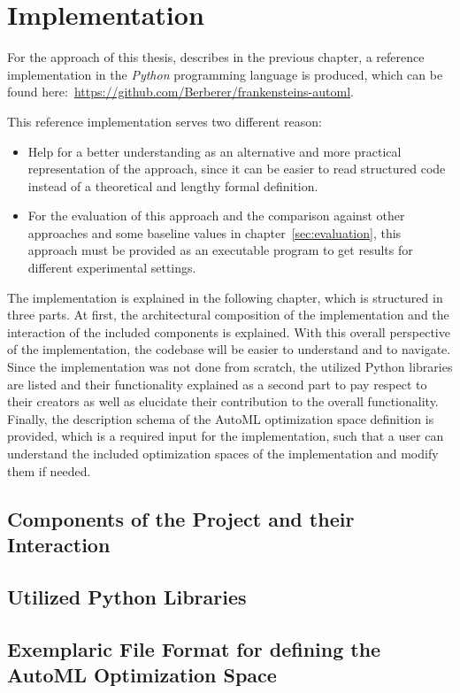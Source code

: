 %
\chapter{Implementation}
\label{sec:implementation}
For the approach of this thesis, describes in the previous chapter, a reference implementation in the \textit{Python} programming language is produced, which can be found here:~\url{https://github.com/Berberer/frankensteins-automl}.

This reference implementation serves two different reason:
\begin{itemize}
	\item Help for a better understanding as an alternative and more practical representation of the approach, since it can be easier to read structured code instead of a theoretical and lengthy formal definition.
	\item For the evaluation of this approach and the comparison against other approaches and some baseline values in chapter~\ref{sec:evaluation}, this approach must be provided as an executable program to get results for different experimental settings.
\end{itemize}

The implementation is explained in the following chapter, which is structured in three parts.
At first, the architectural composition of the implementation and the interaction of the included components is explained.
With this overall perspective of the implementation, the codebase will be easier to understand and to navigate.
Since the implementation was not done from scratch, the utilized Python libraries are listed and their functionality explained as a second part to pay respect to their creators as well as elucidate their contribution to the overall functionality.
Finally, the description schema of the AutoML optimization space definition is provided, which is a required input for the implementation, such that a user can understand the included optimization spaces of the implementation and modify them if needed.

\section{Components of the Project and their Interaction}
\label{sec:implementation:components}

\Blindtext

\section{Utilized Python Libraries}
\label{sec:implementation:libraries}

\Blindtext

\section{Exemplaric File Format for defining the AutoML Optimization Space}
\label{sec:implementation:json}

\Blindtext
